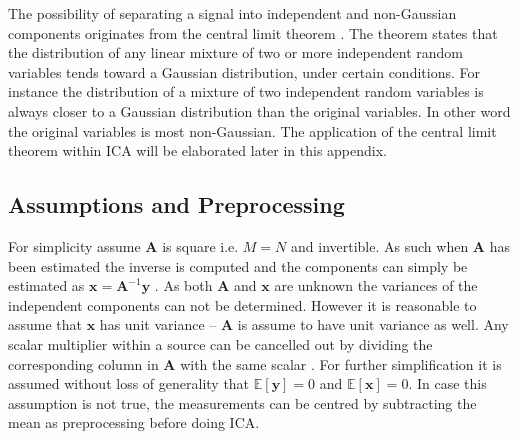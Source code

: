 The possibility of separating a signal into independent and non-Gaussian components originates from the central limit theorem \cite[p. 34]{ICA}. 
The theorem states that the distribution of any linear mixture of two or more independent random variables tends toward a Gaussian distribution, under certain conditions. 
For instance the distribution of a mixture of two independent random variables is always closer to a Gaussian distribution than the original variables. In other word the original variables is most non-Gaussian.   
The application of the central limit theorem within ICA will be elaborated later in this appendix.

\subsection{Assumptions and Preprocessing}
For simplicity assume $\mathbf{A}$ is square i.e. $M = N$ and invertible. 
As such when $\mathbf{A}$ has been estimated the inverse is computed and the components can simply be estimated as $\mathbf{x} = \mathbf{A}^{-1} \mathbf{y}$ \cite[p. 152-153]{ICA}.
As both $\mathbf{A}$ and $\mathbf{x}$ are unknown the variances of the independent components can not be determined. 
However it is reasonable to assume that $\mathbf{x}$ has unit variance -- $\mathbf{A}$ is assume to have unit variance as well. 
Any scalar multiplier within a source can be cancelled out by dividing the corresponding column in $\mathbf{A}$ with the same scalar \cite[p. 154]{ICA}.
For further simplification it is assumed without loss of generality that $\mathbb{E}[\mathbf{y}] = 0$ and $\mathbb{E}[\mathbf{x}] = 0$\cite[p. 154]{ICA}. 
In case this assumption is not true, the measurements can be centred by subtracting the mean as preprocessing before doing ICA.

